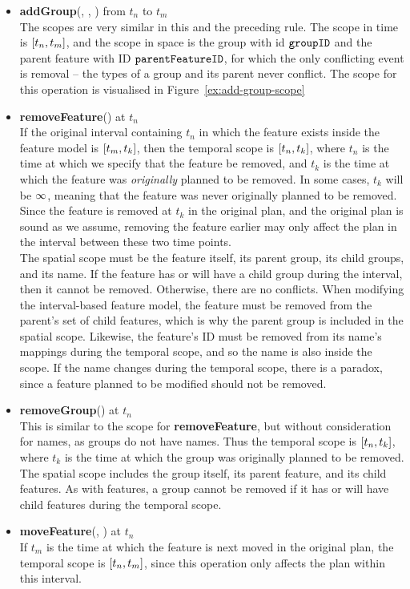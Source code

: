 \begin{itemize}
  \item \textbf{addGroup}(, , ) from $t_n$ to $t_m$\\
    The scopes are very similar in this and the preceding rule. The scope in time is $\interval{t_n}{t_m}$, and the scope in space is the group with id $\texttt{groupID}$ and the parent feature with ID $\texttt{parentFeatureID}$, for which the only conflicting event is removal -- the types of a group and its parent never conflict. The scope for this operation is visualised in Figure~\vref{ex:add-group-scope}
  \item \textbf{removeFeature}() at $t_n$\\
    If the original interval containing $t_n$ in which the feature exists inside the feature model is $\interval{t_m}{t_k}$, then the temporal scope is $\interval{t_n}{t_k}$, where $t_n$ is the time at which we specify that the feature be removed, and $t_k$ is the time at which the feature was \emph{originally} planned to be removed. In some cases, $t_k$ will be $\infty$, meaning that the feature was never originally planned to be removed. Since the feature is removed at $t_k$ in the original plan, and the original plan is sound as we assume, removing the feature earlier may only affect the plan in the interval between these two time points.\\
    The spatial scope must be the feature itself, its parent group, its child groups, and its name. If the feature has or will have a child group during the interval, then it cannot be removed. Otherwise, there are no conflicts. When modifying the interval-based feature model, the feature must be removed from the parent's set of child features, which is why the parent group is included in the spatial scope. Likewise, the feature's ID must be removed from its name's mappings during the temporal scope, and so the name is also inside the scope. If the name changes during the temporal scope, there is a paradox, since a feature planned to be modified should not be removed.  
  \item \textbf{removeGroup}() at $t_n$\\
    This is similar to the scope for \textbf{removeFeature}, but without consideration for names, as groups do not have names.  Thus the temporal scope is $\interval{t_n}{t_k}$, where $t_k$ is the time at which the group was originally planned to be removed. The spatial scope includes the group itself, its parent feature, and its child features. As with features, a group cannot be removed if it has or will have child features during the temporal scope.
  \item \textbf{moveFeature}(, ) at $t_n$\\
  If $t_m$ is the time at which the feature is next moved in the original plan, the temporal scope is $\interval{t_n}{t_m}$, since this operation only affects the plan within this interval.
  \begin{figure}[h]
    \centering


\end{figure}
\end{itemize}
